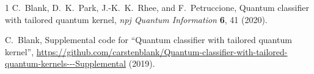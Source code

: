 \documentclass[11pt,a4paper]{article}
\begin{document}
\begin{thebibliography}{1}
C.~Blank, D.~K.~Park, J.-K.~K.~Rhee, and F.~Petruccione,
\newblock Quantum classifier with tailored quantum kernel,
\newblock \emph{npj Quantum Information} \textbf{6}, 41 (2020).

C.~Blank,
\newblock Supplemental code for ``Quantum classifier with tailored quantum kernel'',
\newblock \url{https://github.com/carstenblank/Quantum-classifier-with-tailored-quantum-kernels---Supplemental}
(2019).
\end{thebibliography}
\end{document}
